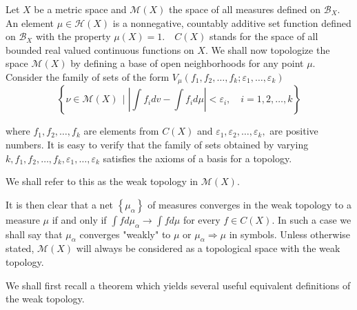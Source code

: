 Let \( X \) be a metric space and \( \mathscr { M } ( X ) \) the space of all measures defined on \( \mathscr { B } _ { X } . \) An element \( \mu \in \mathscr { H } ( X ) \) is a nonnegative, countably additive set function defined on \( \mathscr { B } _ { X } \) with the property \( \mu ( X ) = 1 . \quad C ( X ) \) stands for the space of all bounded real valued continuous functions on \( X \).  We shall now topologize the space \( \mathscr { M } ( X ) \) by defining a base of open neighborhoods for any point \( \mu . \) Consider the family of sets of the form
\( V _ { \mu } \left( f _ { 1 } , f _ { 2 } , \ldots , f _ { k } ; \varepsilon _ { 1 } , \ldots , \varepsilon _ { k } \right) \)
\[ \left\{\nu \in \mathscr { M } ( X ) \, \mid  \left| \int f _ { i } d v - \int f _ { i } d \mu \right| < \varepsilon _ { i } , \quad i = 1,2 , \ldots , k \right\} \]

where \( f _ { 1 } , f _ { 2 } , \ldots , f _ { k } \) are elements from \( C ( X ) \) and \( \varepsilon _ { 1 } , \varepsilon _ { 2 } , \ldots , \varepsilon _ { k } , \) are positive numbers. It is easy to verify that the family of sets obtained by varying \( k , f _ { 1 } , f _ { 2 } , \ldots , f _ { k } , \varepsilon _ { 1 } , \ldots , \varepsilon _ { k } \) satisfies the axioms of a basis for a topology.

\begin{defn}
	We shall refer to this as the weak topology  in \( \mathscr { M } ( X ) \).
\end{defn}

It is then clear that a net \( \left\{ \mu _ { \alpha } \right\} \) of measures converges in the weak topology to a measure \( \mu \) if and only if \( \int f d \mu _ { \alpha } \rightarrow \int f d \mu \) for every \( f \in C ( X ) . \) In such a case we shall say that \( \mu _ { \alpha } \) converges "weakly" to \( \mu \) or \( \mu _ { \alpha } \Rightarrow \mu \) in symbols. Unless otherwise stated, \( \mathscr { M } ( X ) \) will always be considered as a topological space with the weak topology.

We shall first recall a theorem which yields several useful equivalent definitions of the weak topology.

